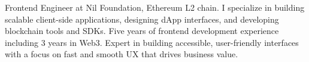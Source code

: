 

\begin{cvparagraph}

Frontend Engineer at Nil Foundation, Ethereum L2 chain.
I specialize in building scalable client-side applications, designing dApp interfaces, and developing blockchain tools and SDKs.
\newline
Five years of frontend development experience including 3 years in Web3.
\newline
Expert in building accessible, user-friendly interfaces with a focus on fast and smooth UX that drives business value.
\end{cvparagraph}

